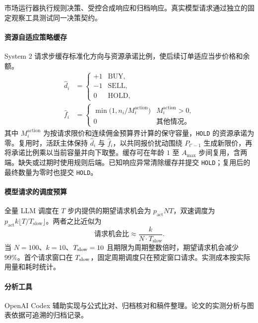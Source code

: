 市场运行器执行规则决策、受控合成响应和归档响应。真实模型请求通过独立的固定观察工具测试同一决策契约。

\paragraph{资源自适应策略缓存} System 2 请求步缓存标准化方向与资源承诺比例，使后续订单适应当步价格和余额。
\begin{equation}
\begin{aligned}
 \widehat d_i &=
 \begin{cases}
   +1 & \mathrm{BUY}, \\
   -1 & \mathrm{SELL}, \\
   0 & \mathrm{HOLD},
 \end{cases} \\
 \widehat f_i &=
 \begin{cases}
   \min\!\bigl(1,n_i/M_i^{\mathrm{action}}\bigr) & M_i^{\mathrm{action}}>0, \\
   0 & \mbox{其他情况。}
 \end{cases}
\end{aligned}
  \label{eq:cache_signature_zh}
\end{equation}
其中 $M_i^{\mathrm{action}}$ 为按请求限价和连续佣金预算界计算的保守容量，\texttt{HOLD} 的资源承诺为零。复用时，活跃主体保持 $\widehat d_i$ 与 $\widehat f_i$，以共同报价扰动围绕 $P_{t'-1}$ 生成新限价，再将承诺比例乘以当前容量并向下取整。缓存可在年龄 $1$ 至 $A_{\max}$ 步间复用，含两端。缺失或过期时使用规则后端。已知响应异常清除缓存并提交 \texttt{HOLD}；复用后的最终数量为零时也提交 \texttt{HOLD}。

\paragraph{模型请求的调度预算} 全量 LLM 调度在 $T$ 步内提供的期望请求机会为 $p_{\mathrm{act}}NT$，双速调度为 $p_{\mathrm{act}}k\lfloor T/T_{\mathrm{slow}}\rfloor$。两者之比近似为
\begin{equation}
  \text{请求机会比} \approx \frac{k}{N \cdot T_{\mathrm{slow}}}.
  \label{eq:cost_ratio_zh}
\end{equation}
当 $N=100$、$k=10$、$T_{\rm slow}=10$ 且期限为周期整数倍时，期望请求机会减少 99\%。首个请求窗口在 $T_{\rm slow}$，固定周期调度只在预定窗口请求。实测成本按实际用量和耗时统计。
\paragraph{分析工具} OpenAI Codex 辅助实现与公式比对、归档核对和稿件整理。论文的实测分析与图表依据可追溯的归档记录。
